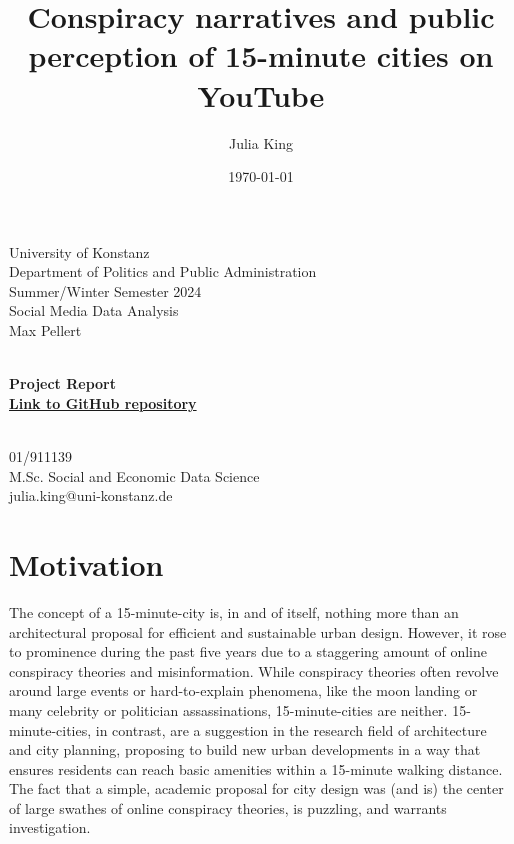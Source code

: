 \documentclass[fontsize=11pt, parskip=half]{scrartcl}
\title{Conspiracy narratives and public perception of 15-minute cities on YouTube}\let\Title\@title
\author{Julia King}          \let\Author\@author
\date{\today}           \let\Date\@date
\makeatletter
\def \papersubtitle {Project Report}
\def \paperdeadline {\href{https://github.com/julia-king-edu/so-24_smda_project}{Link to GitHub repository}}
\def \paperevaluator {Max Pellert}
\def \paperseminar {Social Media Data Analysis}
\def \papersemester {Summer/Winter Semester 2024}
\def \paperdepartment {Department of Politics and Public Administration}
\def \paperuniversity {University of Konstanz}
\def \paperemail {julia.king@uni-konstanz.de}
\def \paperprogramme {M.Sc. Social and Economic Data Science}
\def \papermatriculationnr {01/911139}
\makeatother
\begin{document}
\setlength{\columnsep}{25pt}

\begin{titlepage}
    \newcommand{\HRule}{\rule{\linewidth}{0.5mm}}
    
    \begin{flushleft} %
        \large
        \paperuniversity\\
        \paperdepartment\\
        \papersemester\\
        \paperseminar\\
        \paperevaluator
    \end{flushleft}
    
    \vfill
    
    \begin{center} %
        \huge\bfseries \Title\\
        \vspace{0.5cm}
        \large \papersubtitle \\
        \vspace{0.5cm}
        \small \paperdeadline
    \end{center}
    
    \vfill
    
    \begin{flushright} %
        \large
        \Author\\
        \papermatriculationnr\\
        \paperprogramme\\
        \paperemail
    \end{flushright}
\end{titlepage}

\clearpage
\setcounter{page}{1}

\section{Motivation}
\label{section:motivation}

    The concept of a 15-minute-city is, in and of itself, nothing more than an architectural proposal for efficient and sustainable urban design. However, it rose to prominence during the past five years due to a staggering amount of online conspiracy theories and misinformation. While conspiracy theories often revolve around large events or hard-to-explain phenomena, like the moon landing or many celebrity or politician assassinations, 15-minute-cities are neither. 15-minute-cities, in contrast, are a suggestion in the research field of architecture and city planning, proposing to build new urban developments in a way that ensures residents can reach basic amenities within a 15-minute walking distance. The fact that a simple, academic proposal for city design was (and is) the center of large swathes of online conspiracy theories, is puzzling, and warrants investigation. 
    
\end{document}
